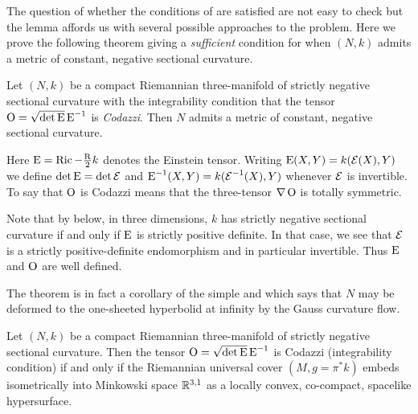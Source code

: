 \documentclass[a4paper, 12pt]{amsart}
\begin{document}
The question of whether the conditions of  are satisfied are not easy to check but the lemma affords us with several possible approaches to the problem. Here we prove the following theorem giving a \emph{sufficient} condition for when \((N, k)\) admits a metric of constant, negative sectional curvature.
\begin{thm}
\label{thm:intg_const_curv}
Let \((N, k)\) be a compact Riemannian three-manifold of strictly negative sectional curvature with the integrability condition that the tensor \(\operatorname{O} = \sqrt{\det \operatorname{E}} \operatorname{E}^{-1}\) is \emph{Codazzi}. Then \(N\) admits a metric of constant, negative sectional curvature.
\end{thm}
Here \(\operatorname{E} = \operatorname{Ric} - \tfrac{\operatorname{R}}{2}k\) denotes the Einstein tensor. Writing \(\operatorname{E}(X, Y) = k(\operatorname{\mathcal{E}}(X), Y)\) we define \(\det \operatorname{E} = \det \operatorname{\mathcal{E}}\) and \(\operatorname{E}^{-1}(X, Y) = k(\operatorname{\mathcal{E}}^{-1} (X), Y)\) whenever \(\operatorname{\mathcal{E}}\) is invertible. To say that \(\operatorname{O}\) is Codazzi means that the three-tensor \(\nabla \operatorname{O}\) is totally symmetric.
\begin{rem}
Note that by  below, in three dimensions, \(k\) has strictly negative sectional curvature if and only if \(\operatorname{E}\) is strictly positive definite. In that case, we see that \(\operatorname{\mathcal{E}}\) is a strictly positive-definite endomorphism and in particular invertible. Thus \(\operatorname{E}\) and \(\operatorname{O}\) are well defined.
\end{rem}
The theorem is in fact a corollary of the simple  and \cite[Theorem 1.1]{MR3344442} which says that \(N\) may be deformed to the one-sheeted hyperbolid at infinity by the Gauss curvature flow.
\begin{thm}
\label{thm:intg_embed}
Let \((N, k)\) be a compact Riemannian three-manifold of strictly negative sectional curvature. Then the tensor \(\operatorname{O} = \sqrt{\det \operatorname{E}} \operatorname{E}^{-1}\) is Codazzi (integrability condition) if and only if the Riemannian universal cover \((M, g = \pi^{\ast} k)\) embeds isometrically into Minkowski space \(\mathbb{R}^{3,1}\) as a locally convex, co-compact, spacelike hypersurface.
\end{thm}
\end{document}
